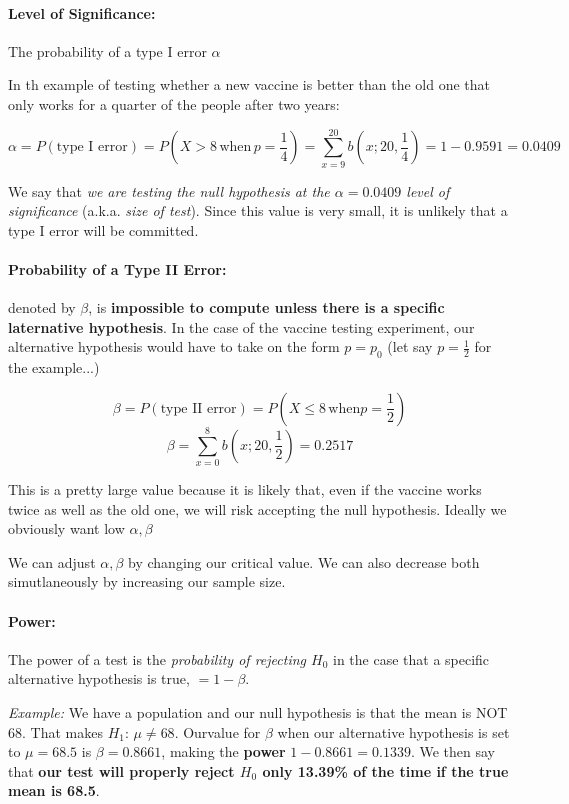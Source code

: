 \documentclass[a4paper,12pt]{report}
\begin{document}
\paragraph{Level of Significance: } The probability of a type I error $\alpha$

In th example of testing whether a new vaccine is better than the old one that only works for a quarter of the people after two years: 

$$\alpha = P(\text{type I error}) = P(X > 8 \,\text{when}\, p = \frac{1}{4}) = 
\sum_{x=9}^{20} b(x;20, \frac{1}{4}) = 1 - 0.9591 = 0.0409$$

We say that \textit{we are testing the null hypothesis at the $\alpha = 0.0409$ level of significance} (a.k.a. \textit{size of test}). Since this value is very small, it is unlikely that a type I error will be committed. 

\paragraph{Probability of a Type II Error: } denoted by $\beta$, is \textbf{impossible to compute unless there is a specific laternative hypothesis}. In the case of the vaccine testing experiment, our alternative hypothesis would have to take on the form $p = p_0$ (let say $p = \frac{1}{2}$ for the example...) 

$$\beta = P(\text{type II error}) = P(X \leq 8 \, \text{when} p = \frac{1}{2})$$
$$\beta = \sum_{x=0}^8 b(x; 20, \frac{1}{2}) = 0.2517$$

This is a pretty large value because it is likely that, even if the vaccine works twice as well as the old one, we will risk accepting the null hypothesis. Ideally we obviously want low $\alpha, \beta$

We can adjust $\alpha, \beta$ by changing our critical value. We can also decrease both simutlaneously by increasing our sample size.

\paragraph{Power: } The power of a test is the \textit{probability of rejecting $H_0$} in the case that a specific alternative hypothesis is true, $= 1-\beta$. 

\textit{Example: } We have a population and our null hypothesis is that the mean is NOT 68. That makes $H_1: \, \mu \neq 68$. Ourvalue for $\beta$ when our alternative hypothesis is set to $\mu = 68.5$ is $\beta = 0.8661$, making the \textbf{power} $1-0.8661 = 0.1339$. We then say that \textbf{our test will properly reject $H_0$ only 13.39\% of the time if the true mean is 68.5}. 
\end{document}
